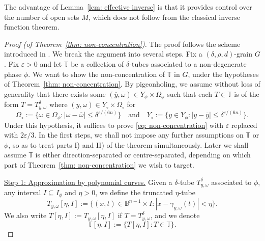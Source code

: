 \documentclass[reqno]{amsart}
\numberwithin{equation}{section}
\newcommand{\B}{\mathbb{B}}
\newcommand{\T}{\mathbb{T}}
\theoremstyle{plain}
\theoremstyle{definition}
\begin{document}
The advantage of Lemma~\ref{lem: effective inverse} is that it provides control over the number of open sets $M$, which does not follow from the classical inverse function theorem.

\begin{proof}[Proof (of Theorem~\ref{thm: non-concentration})] The proof follows the scheme introduced in \cite{KR2018}. We break the argument into several steps. Fix a $(\delta,\rho,d)$-grain $G$. Fix $\varepsilon > 0$ and let $\T$ be a collection of $\delta$-tubes associated to a non-degenerate phase $\phi$. We want to show the non-concentration of $\T$ in $G$, under the hypotheses of Theorem~\ref{thm: non-concentration}. By pigeonholing, we assume without loss of generality that there exists some $(\overline{y}, \overline{\omega}) \in Y_{\phi} \times \Omega_{\phi}$ such that each $T \in \T$ is of the form $T = T_{y, \omega}^{\delta}$ where $(y, \omega) \in Y_{\circ} \times \Omega_{\circ}$ for 
\begin{equation*}
\Omega_{\circ} := \big\{ \omega \in \Omega_{\phi} : |\omega - \overline{\omega}| \leq \delta^{\varepsilon/(6n)} \big\} \quad \textrm{and} \quad Y_{\circ} := \big\{y \in Y_{\phi} : |y - \overline{y}| \leq \delta^{\varepsilon/(6n)}\big\}.
\end{equation*}
 Under this hypothesis, it suffices to prove \eqref{eq: non-concentration} with $\varepsilon$ replaced with $2\varepsilon/3$. In the first steps, we shall not impose any further assumptions on $\T$ or $\phi$, so as to treat parts I) and II) of the theorem simultaneously. Later we shall assume $\T$ is either direction-separated or centre-separated, depending on which part of Theorem~\ref{thm: non-concentration} we wish to target.\medskip






\noindent \underline{Step 1: Approximation by polynomial curves.} Given a $\delta$-tube $T_{y, \omega}^{\delta}$ associated to $\phi$, any interval $I \subseteq I_{\phi}$ and $\eta > 0$, we define the truncated $\eta$-tube
\begin{equation*}
T_{y, \omega}[\eta, I]  := \big\{ (x,t) \in \B^{n-1} \times I : |x - \gamma_{y, \omega}(t)| < \eta \big\}.
\end{equation*}
We also write $T[\eta, I] := T_{y, \omega}[\eta, I]$ if $T = T_{y, \omega}^{\delta}$, and we denote
\begin{equation*}
    \T[\eta, I] := \big\{ T[\eta, I]  : T \in \T \big\}.
\end{equation*}



\end{proof}
\end{document}

